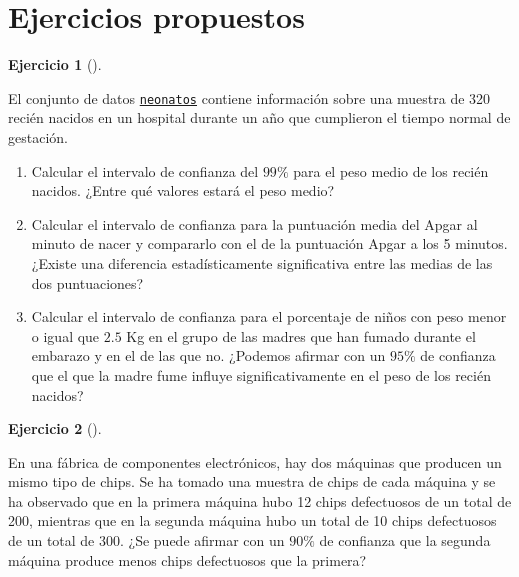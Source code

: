\documentclass[
  a4paper,
]{scrreport}
\theoremstyle{definition}
\newtheorem{exercise}{Ejercicio}[chapter]
\theoremstyle{remark}
\begin{document}
\section{Ejercicios propuestos}\label{ejercicios-propuestos-5}

\begin{exercise}[]\protect\hypertarget{exr-intervalos-confianza-1-poblacion-neonatos}{}\label{exr-intervalos-confianza-1-poblacion-neonatos}

El conjunto de datos
\href{https://aprendeconalf.es/estadistica-practicas-r/datos/neonatos.csv}{\texttt{neonatos}}
contiene información sobre una muestra de 320 recién nacidos en un
hospital durante un año que cumplieron el tiempo normal de gestación.

\begin{enumerate}
\def\labelenumi{\alph{enumi}.}
\item
  Calcular el intervalo de confianza del \(99\%\) para el peso medio de
  los recién nacidos. ¿Entre qué valores estará el peso medio?
\item
  Calcular el intervalo de confianza para la puntuación media del Apgar
  al minuto de nacer y compararlo con el de la puntuación Apgar a los 5
  minutos. ¿Existe una diferencia estadísticamente significativa entre
  las medias de las dos puntuaciones?
\item
  Calcular el intervalo de confianza para el porcentaje de niños con
  peso menor o igual que \(2.5\) Kg en el grupo de las madres que han
  fumado durante el embarazo y en el de las que no. ¿Podemos afirmar con
  un \(95\%\) de confianza que el que la madre fume influye
  significativamente en el peso de los recién nacidos?
\end{enumerate}

\end{exercise}

\begin{exercise}[]\protect\hypertarget{exr-intervalos-confianza-1-poblacion-piezas-defectuosas}{}\label{exr-intervalos-confianza-1-poblacion-piezas-defectuosas}

En una fábrica de componentes electrónicos, hay dos máquinas que
producen un mismo tipo de chips. Se ha tomado una muestra de chips de
cada máquina y se ha observado que en la primera máquina hubo 12 chips
defectuosos de un total de 200, mientras que en la segunda máquina hubo
un total de 10 chips defectuosos de un total de 300. ¿Se puede afirmar
con un \(90\%\) de confianza que la segunda máquina produce menos chips
defectuosos que la primera?

\end{exercise}
\end{document}
